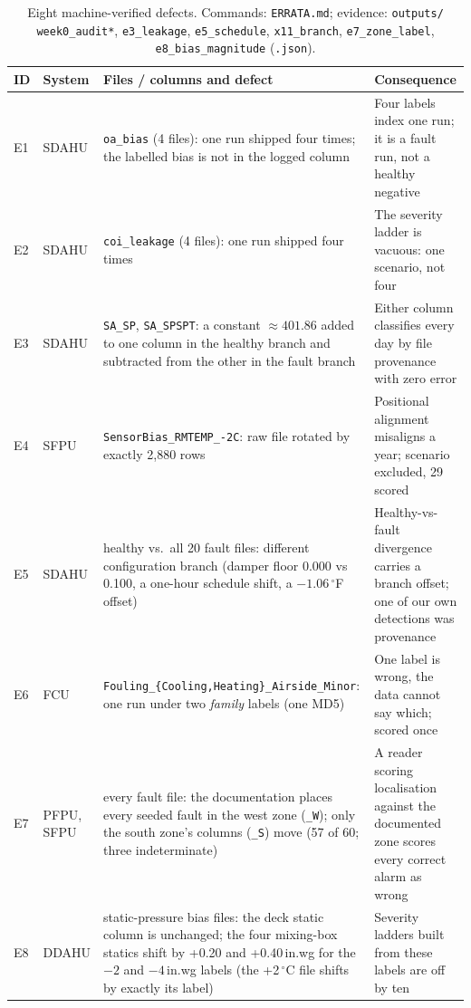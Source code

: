 \documentclass[runningheads]{llncs}
\begin{document}
\begin{table}[!htb]
\centering
\caption{Eight machine-verified defects. Commands: \texttt{ERRATA.md}; evidence: \texttt{outputs/} \texttt{week0\_audit*}, \texttt{e3\_leakage}, \texttt{e5\_schedule}, \texttt{x11\_branch}, \texttt{e7\_zone\_label}, \texttt{e8\_bias\_magnitude} (\texttt{.json}).}
\label{tab:errata}
\scriptsize
\setlength{\tabcolsep}{3pt}
\begin{tabular}{@{}p{}p{}p{}p{}@{}}
\hline
ID & System & Files / columns and defect & Consequence \\
\hline
E1 & SDAHU & \texttt{oa\_bias} (4 files): one run shipped four times; the labelled bias is not in the logged column & Four labels index one run; it is a fault run, not a healthy negative \\
E2 & SDAHU & \texttt{coi\_leakage} (4 files): one run shipped four times & The severity ladder is vacuous: one scenario, not four \\
E3 & SDAHU & \texttt{SA\_SP}, \texttt{SA\_SPSPT}: a constant $\approx 401.86$ added to one column in the healthy branch and subtracted from the other in the fault branch & Either column classifies every day by file provenance with zero error \\
E4 & SFPU & \texttt{SensorBias\_RMTEMP\_-2C}: raw file rotated by exactly 2{,}880 rows & Positional alignment misaligns a year; scenario excluded, 29 scored \\
E5 & SDAHU & healthy vs.\ all 20 fault files: different configuration branch (damper floor 0.000 vs 0.100, a one-hour schedule shift, a $-1.06\,^\circ$F offset) & Healthy-vs-fault divergence carries a branch offset; one of our own detections was provenance \\
E6 & FCU & \texttt{Fouling\_\{Cooling,Heating\}\_Airside\_Minor}: one run under two \emph{family} labels (one MD5) & One label is wrong, the data cannot say which; scored once \\
E7 & PFPU, SFPU & every fault file: the documentation places every seeded fault in the west zone (\texttt{\_W}); only the south zone's columns (\texttt{\_S}) move (57 of 60; three indeterminate) & A reader scoring localisation against the documented zone scores every correct alarm as wrong \\
E8 & DDAHU & static-pressure bias files: the deck static column is unchanged; the four mixing-box statics shift by +0.20 and +0.40\,in.wg for the $-2$ and $-4$\,in.wg labels (the +2\,$^\circ$C file shifts by exactly its label) & Severity ladders built from these labels are off by ten \\
\hline
\end{tabular}
\end{table}
\end{document}
